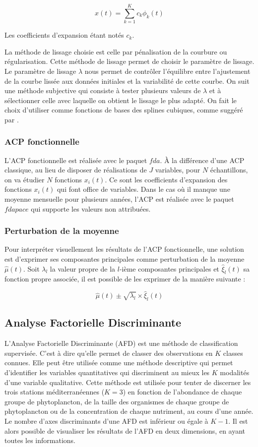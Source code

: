 \documentclass[12pt]{article}
\begin{document}
\[x(t)=\sum_{k=1}^Kc_k\phi_k(t)\]

Les coefficients d'expansion étant notés $c_k$.

La méthode de lissage choisie est celle par pénalisation de la courbure ou régularisation. Cette méthode de lissage permet de choisir le paramètre de lissage. Le paramètre de lissage $\lambda$ nous permet de contrôler l'équilibre entre l'ajustement de la courbe lissée aux données initiales et la variabilité de cette courbe. On suit une méthode subjective qui consiste à tester plusieurs valeurs de $\lambda$ et à sélectionner celle avec laquelle on obtient le lissage le plus adapté. On fait le choix d’utiliser comme fonctions de bases des splines cubiques, comme suggéré par \citet{Ramsay1998}.

\subsubsection{ACP fonctionnelle}

L'ACP fonctionnelle est réalisée avec le paquet $fda$. À la différence d’une ACP classique, au lieu de disposer de réalisations de $J$ variables, pour $N$ échantillons, on va étudier $N$ fonctions $x_i(t)$. Ce sont les coefficients d’expansion des fonctions $x_i(t)$ qui font office de variables. Dans le cas où il manque une moyenne mensuelle pour plusieurs années, l’ACP est réalisée avec le paquet $fdapace$ qui supporte les valeurs non attribuées.

\subsubsection{Perturbation de la moyenne}

Pour interpréter visuellement les résultats de l’ACP fonctionnelle, une solution est d'exprimer ses composantes principales comme perturbation de la moyenne $\hat{\mu}(t)$. Soit $\lambda_l$ la valeur propre de la $l$-ième composantes principales et $\hat{\xi}_l(t)$ sa fonction propre associée, il est possible de les exprimer de la manière suivante \citep{Nerini2022} : 

\[\hat{\mu}(t) \pm \sqrt{\lambda_l}\times \hat{\xi}_l(t)\]


\subsection{Analyse Factorielle Discriminante}

L’Analyse Factorielle Discriminante (AFD) est une méthode de classification supervisée. C’est à dire qu’elle permet de classer des observations en $K$ classes connues. Elle peut être utilisée comme une méthode descriptive qui permet d’identifier les variables quantitatives qui discriminent au mieux les $K$ modalités d’une variable qualitative. Cette méthode est utilisée pour tenter de discerner les trois stations méditerranéennes ($K=3$) en fonction de l’abondance de chaque groupe de phytoplancton, de la taille des organismes de chaque groupe de phytoplancton ou de la concentration de chaque nutriment, au cours d’une année. Le nombre d’axes discriminants d’une AFD est inférieur ou égale à $K-1$. Il est alors possible de visualiser les résultats de l’AFD en deux dimensions, en ayant toutes les informations.  
\end{document}
